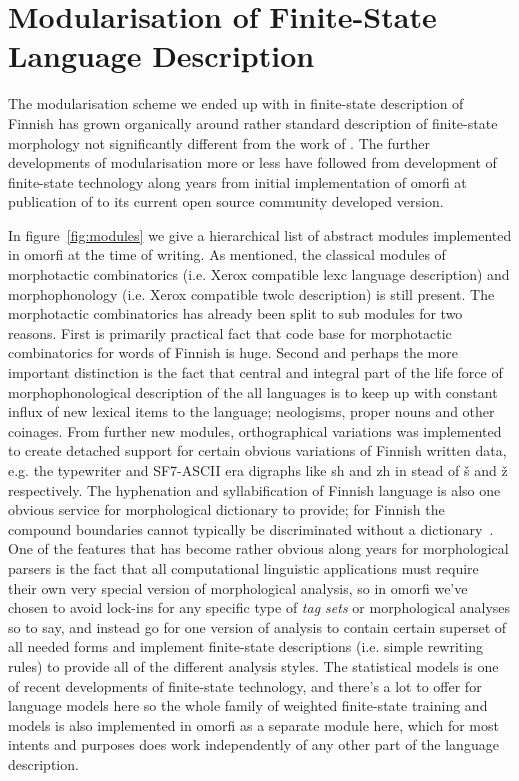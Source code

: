 \documentclass[postprint]{flammie}
\begin{document}
\section{Modularisation of Finite-State Language Description}
\label{sec:modules}

The modularisation scheme we ended up with in finite-state description of
Finnish has grown organically around rather standard description of
finite-state morphology not significantly different from the work of
\cite{koskenniemi/1983}. The further developments of modularisation more or
less have followed from development of finite-state technology along years
from initial implementation of omorfi at publication of \cite{pirinen/2008}
to its current open source community developed version.

In figure~\ref{fig:modules} we give a hierarchical list of abstract
modules implemented in omorfi at the time of writing. As mentioned, the
classical modules of morphotactic combinatorics (i.e. Xerox compatible lexc
language description) and morphophonology (i.e. Xerox compatible twolc
description) is still present. The morphotactic combinatorics has already been
split to sub modules for two reasons. First is primarily practical fact
that code base for morphotactic combinatorics for words of Finnish is huge.
Second and perhaps the more important distinction is the fact that central
and integral part of the life force of morphophonological description of
the all languages is to keep up with constant influx of new lexical items
to the language; neologisms, proper nouns and other coinages.  From further
new modules, orthographical variations was implemented to create detached
support for certain obvious variations of Finnish written data, e.g. the
typewriter and SF7-ASCII era digraphs like sh and zh in stead of š and ž
respectively. The hyphenation and syllabification of Finnish language is also
one obvious service for morphological dictionary to provide; for Finnish the
compound boundaries cannot typically be discriminated without a
dictionary~\cite{linden/2009/nodalida}.  One of the features that has become
rather obvious along years for morphological parsers is the fact that all
computational linguistic applications must require their own very special
version of morphological analysis, so in omorfi we've chosen to avoid lock-ins
for any specific type of \emph{tag sets} or morphological analyses so to say,
and instead go for one version of analysis to contain certain superset of all
needed forms and implement finite-state descriptions (i.e. simple rewriting
rules) to provide all of the different analysis styles. The statistical models
is one of recent developments of finite-state technology, and there's a lot
to offer for language models here so the whole family of weighted finite-state
training and models is also implemented in omorfi as a separate module here,
which for most intents and purposes does work independently of any other part
of the language description.
\end{document}
